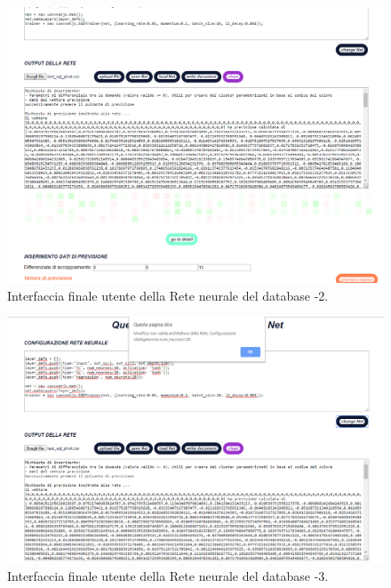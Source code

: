 \begin{figure}[H]
\centering
	\includegraphics[width=1\linewidth]{./image/Rete-di-prova_db2.png}
	\caption{Interfaccia finale utente della Rete neurale del database -2.}
	\label{Interfaccia finale utente della Rete neurale del database -2.}
\end{figure}
\noindent

\begin{figure}[H]
\centering
	\includegraphics[width=1\linewidth]{./image/Rete-di-prova_db3.png}
	\caption{Interfaccia finale utente della Rete neurale del database -3.}
	\label{Interfaccia finale utente della Rete neurale del database -3.}
\end{figure}
\noindent
